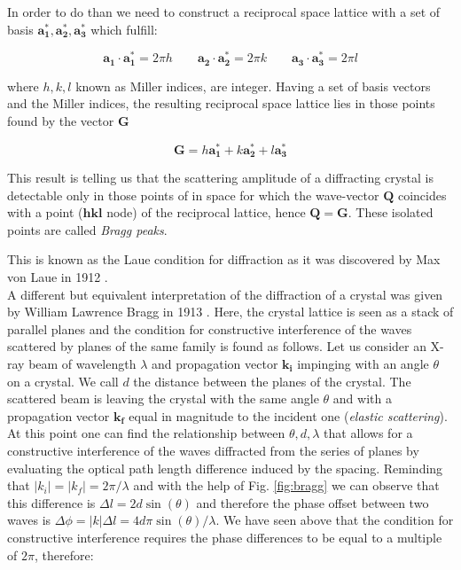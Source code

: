 In order to do than we need to construct a reciprocal space lattice with a set of basis ${\mathbf{a_1^\ast}, \mathbf{a_2^\ast}, \mathbf{a_3^\ast}}$ 
which fulfill: 

\begin{equation}
    \mathbf{a_1} \cdot \mathbf{a_1^\ast} = 2\pi h \qquad \mathbf{a_2} \cdot \mathbf{a_2^\ast} = 2\pi k \qquad \mathbf{a_3} \cdot \mathbf{a_3^\ast} = 2\pi l 
   \label{eq:miller}
\end{equation}

where $ h, k, l $ known as Miller indices, are integer. Having a set of basis vectors and the Miller indices, the 
resulting reciprocal space lattice lies in those points found by the vector $\mathbf{G}$ 

\begin{equation}
    \mathbf{G} =  h\mathbf{a_1^\ast} + k\mathbf{a_2^\ast} + l\mathbf{a_3^\ast} 
   \label{eq:G}
\end{equation}

This result is telling us that the scattering amplitude of a diffracting crystal is detectable only in those points of 
in space for which the wave-vector $\mathbf{Q}$ coincides with a point ($\mathbf{hkl}$ node) of the reciprocal lattice, 
hence $\mathbf{Q} = \mathbf{G}$. These isolated points are called \textit{Bragg peaks}.

This is known as the Laue condition for diffraction as it was discovered by Max von Laue in 1912 \cite{FriedrichKnippingLaue1912}.\\ 

A different but equivalent interpretation of the diffraction of a crystal was given by William Lawrence Bragg in 1913 \cite{Bragg1913}. 
Here, the crystal lattice is seen as a stack of parallel planes and the condition for constructive interference of 
the waves scattered by planes of the same family is found as follows.
Let us consider an X-ray beam of wavelength $\lambda$ and propagation vector $\mathbf{k_i} $ impinging with an angle $\theta$ 
on a crystal. We call $d$ the distance between the planes of the crystal. The scattered beam is leaving the crystal with the 
same angle $\theta$ and with a propagation vector $\mathbf{k_f}$ equal in magnitude to the incident one (\textit{elastic scattering}). 
At this point one can find the relationship between $ \theta, d, \lambda$ that allows for a constructive interference of the 
waves diffracted from the series of planes by evaluating the optical path length difference induced by the spacing. 
Reminding that $\left|k_i\right| = \left|k_f\right| = 2\pi/\lambda $ and with the help of Fig. \ref{fig:bragg} we can observe that this 
difference is $\Delta l = 2 d \sin(\theta)$ and therefore the phase offset between two waves is $\Delta \phi = \left|k\right| \Delta l 
= 4 d\pi \sin(\theta)/\lambda $. We have seen above that the condition for constructive interference requires the phase 
differences to be equal to a multiple of $2\pi$, therefore: 

